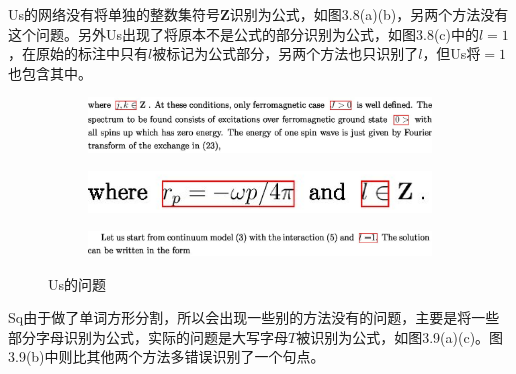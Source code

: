 Us的网络没有将单独的整数集符号$\mathbf{Z}$识别为公式，如图3.8(a)(b)，另两个方法没有这个问题。另外Us出现了将原本不是公式的部分识别为公式，如图3.8(c)中的$l=1$，在原始的标注中只有$l$被标记为公式部分，另两个方法也只识别了$l$，但Us将$=1$也包含其中。

\begin{figure}[hp]
    \centering

    \begin{subfigure}[b]{\linewidth}
    \centering
    \includegraphics[scale=0.3]{eps/us1.eps}
    \caption{\label{fig:fig1}}
    \end{subfigure}

    \begin{subfigure}[b]{\linewidth}
    \centering
    \includegraphics[scale=0.3]{eps/us2.eps}
    \caption{\label{fig:fig2}}
    \end{subfigure}

    \begin{subfigure}[b]{\linewidth}
    \centering
    \includegraphics[scale=0.3]{eps/us3.eps}
    \caption{\label{fig:fig3}}
    \end{subfigure}

    \caption{Us的问题}
    \label{fig:label}
\end{figure}

Sq由于做了单词方形分割，所以会出现一些别的方法没有的问题，主要是将一些部分字母识别为公式，实际的问题是大写字母$T$被识别为公式，如图3.9(a)(c)。图3.9(b)中则比其他两个方法多错误识别了一个句点。


